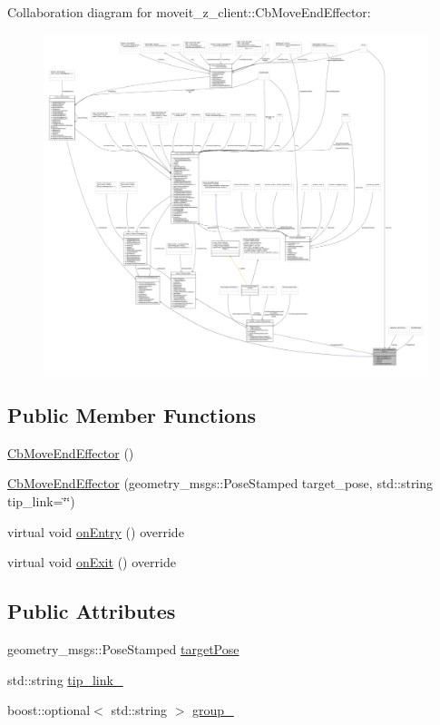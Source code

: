 Collaboration diagram for moveit\+\_\+z\+\_\+client\+:\+:Cb\+Move\+End\+Effector\+:
\nopagebreak
\begin{figure}[H]
\begin{center}
\leavevmode
\includegraphics[width=350pt]{classmoveit__z__client_1_1CbMoveEndEffector__coll__graph}
\end{center}
\end{figure}
\subsection*{Public Member Functions}
\begin{DoxyCompactItemize}
\item 
\hyperlink{classmoveit__z__client_1_1CbMoveEndEffector_acd25310b5088e3eeaa75220d283546e8}{Cb\+Move\+End\+Effector} ()
\item 
\hyperlink{classmoveit__z__client_1_1CbMoveEndEffector_a688d63425a7a67c3f26d1ae90733ccb1}{Cb\+Move\+End\+Effector} (geometry\+\_\+msgs\+::\+Pose\+Stamped target\+\_\+pose, std\+::string tip\+\_\+link=\char`\"{}\char`\"{})
\item 
virtual void \hyperlink{classmoveit__z__client_1_1CbMoveEndEffector_a5306018b432c9d8f8a31823f6b317d84}{on\+Entry} () override
\item 
virtual void \hyperlink{classmoveit__z__client_1_1CbMoveEndEffector_af3fdc6c596da7792cfc9bbef13cb02fc}{on\+Exit} () override
\end{DoxyCompactItemize}
\subsection*{Public Attributes}
\begin{DoxyCompactItemize}
\item 
geometry\+\_\+msgs\+::\+Pose\+Stamped \hyperlink{classmoveit__z__client_1_1CbMoveEndEffector_abea9c6077733077baced34c6098c6140}{target\+Pose}
\item 
std\+::string \hyperlink{classmoveit__z__client_1_1CbMoveEndEffector_abd92e9d3d67bdde11f9e38e0b44a2b8b}{tip\+\_\+link\+\_\+}
\item 
boost\+::optional$<$ std\+::string $>$ \hyperlink{classmoveit__z__client_1_1CbMoveEndEffector_ab2d23ae054dbc0c2a5f3e6bbc84e07dd}{group\+\_\+}
\end{DoxyCompactItemize}
